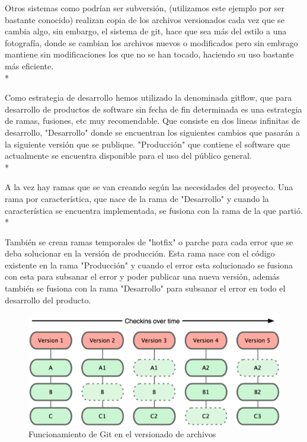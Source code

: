 \documentclass[../pfc.tex]{subfiles}
\begin{document}
	Otros sistemas como podrían ser subversión, (utilizamos este ejemplo por ser bastante conocido) realizan copia de los archivos versionados cada vez que se cambia algo, sin embargo, el sistema de git, hace que sea más del estilo a una fotografía, donde se cambian los archivos nuevos o modificados pero sin embrago mantiene sin modificaciones los que no se han tocado, haciendo su uso bastante más eficiente\cite{funcgit2}.\\*
	
	Como estrategia de desarrollo hemos utilizado la denominada gitflow, que para desarrollo de productos de software sin fecha de fin determinada es una estrategia de ramas, fusiones, etc muy recomendable. Que consiste en dos lineas infinitas de desarrollo, "Desarrollo" donde se encuentran los siguientes cambios que pasarán a la siguiente versión que se publique. "Producción" que contiene el software que actualmente se encuentra disponible para el uso del público general.\\*
	
	A la vez hay ramas que se van creando según las necesidades del proyecto. Una rama por característica, que nace de la rama de "Desarrollo" y cuando la característica se encuentra implementada, se fusiona con la rama de la que partió. \\*
	
	También se crean ramas temporales de "hotfix" o parche para cada error que se deba solucionar en la versión de producción. Esta rama nace con el código existente en la rama "Producción" y cuando el error esta solucionado se fusiona con esta para subsanar el error y poder publicar una nueva versión, además también se fusiona con la rama "Desarrollo" para subsanar el error en todo el desarrollo del producto.
	
	\begin{figure}[H]
	\centering
	\includegraphics[width=0.7\linewidth]{../images/funcionamiento_git}
	\caption{Funcionamiento de Git en el versionado de archivos}
	\label{fig:funcionamiento_git}
	\end{figure}
\end{document}
